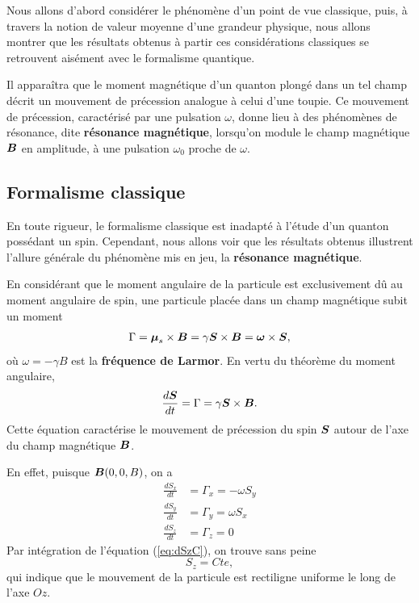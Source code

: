 Nous allons d'abord considérer le phénomène d'un point de vue classique, puis,
à travers la notion de valeur moyenne d'une grandeur physique, nous allons
montrer que les résultats obtenus à partir ces considérations classiques se
retrouvent aisément avec le formalisme quantique.

Il apparaîtra que le moment magnétique d'un quanton plongé dans un tel champ
décrit un mouvement de précession analogue à celui d'une toupie. Ce mouvement de
précession, caractérisé par une pulsation $\omega$, donne lieu à des phénomènes
de résonance, dite \textbf{résonance magnétique}, lorsqu'on module le champ
magnétique $\boldsymbol{B}$ en amplitude, à une pulsation $\omega_0$ proche de
$\omega$.

\subsection{Formalisme classique}

En toute rigueur, le formalisme classique est inadapté à l'étude d'un quanton
possédant un spin. Cependant, nous allons voir que les résultats obtenus
illustrent l'allure générale du phénomène mis en jeu, la \textbf{résonance
magnétique}.

En considérant que le moment angulaire de la particule est exclusivement dû au
moment angulaire de spin, une particule placée dans un champ magnétique subit un
moment
\begin{equation}
 \Gamma=\boldsymbol{\mu}_{s}\times\boldsymbol{B}=\gamma\boldsymbol{S}\times\boldsymbol{B}=\boldsymbol{\omega}
\times\boldsymbol{S},
\end{equation}
où $\omega=-\gamma B$  est la \textbf{fréquence de Larmor}. En vertu du théorème
du moment angulaire,
\begin{equation}
	\frac{d\boldsymbol{S}}{dt}=\Gamma=\gamma\boldsymbol{S}\times\boldsymbol{B}.
\end{equation}
Cette équation caractérise le mouvement de précession du spin $\boldsymbol{S}$ autour
de l'axe du champ magnétique $\boldsymbol{B}$.

En effet, puisque $\boldsymbol{B}(0,0,B)$, on a
\begin{subequations}
 \begin{align}
  \frac{dS_{x}}{dt} & =\Gamma_{x}=-\omega S_{y}\label{eq:dSxC}\\
  \frac{dS_{y}}{dt} & =\Gamma_{y}=\omega S_{x}\label{eq:dSyC}\\
  \frac{dS_z}{dt} & =\Gamma_z=0 \label{eq:dSzC}
 \end{align}
\end{subequations}
Par intégration de l'équation (\ref{eq:dSzC}), on trouve sans peine
\begin{equation}
 S_z=Cte,
\end{equation}
qui indique que le mouvement de la particule est rectiligne uniforme le long de
l'axe $Oz$.

